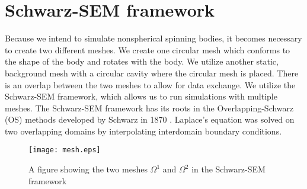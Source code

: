 \section{Schwarz-SEM framework}
\label{section:schwarz-SEM_framework}
Because we intend to simulate nonspherical spinning bodies, it becomes necessary to create two different meshes. We create one circular mesh which conforms to the shape of the body and rotates with the body. We utilize another static, background mesh with a circular cavity where the circular mesh is placed. There is an overlap between the two meshes to allow for data exchange. We utilize the Schwarz-SEM framework, which allows us to run simulations with multiple meshes. The Schwarz-SEM framework has its roots in the Overlapping-Schwarz (OS) methods developed by Schwarz in 1870 \cite{mittal_nonconforming_2019}. Laplace's equation was solved on two overlapping domains by interpolating interdomain boundary conditions.  

\begin{figure}\centerline{\texttt{[image: mesh.eps]}}
    \caption{A figure showing the two meshes $\Omega^1$ and $\Omega^2$ in the Schwarz-SEM framework}
    \label{fig:mesh}
\end{figure}


